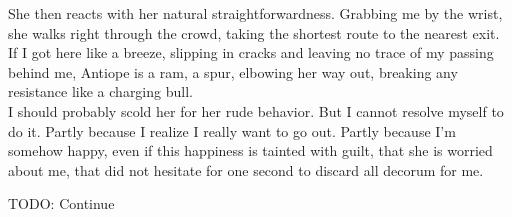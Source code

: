 \documentclass{report}
\begin{document}
She then reacts with her natural straightforwardness. Grabbing me by the wrist, she walks right through the crowd, taking the shortest route to the nearest exit. If I got here like a breeze, slipping in cracks and leaving no trace of my passing behind me, Antiope is a ram, a spur, elbowing her way out, breaking any resistance like a charging bull.\\

I should probably scold her for her rude behavior. But I cannot resolve myself to do it. Partly because I realize I really want to go out. Partly because I'm somehow happy, even if this happiness is tainted with guilt, that she is worried about me, that did not hesitate for one second to discard all decorum for me.

TODO: Continue
\end{document}
